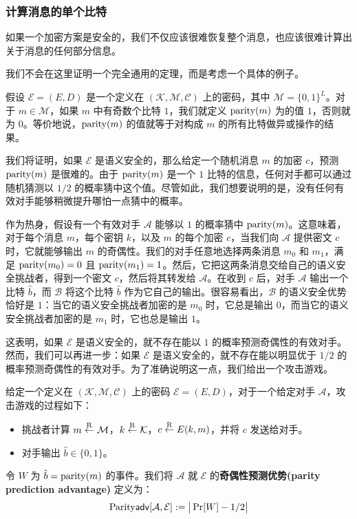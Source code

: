 \subsubsection{计算消息的单个比特}\label{subsubsec:2-2-3-2}

如果一个加密方案是安全的，我们不仅应该很难恢复整个消息，也应该很难计算出关于消息的任何部分信息。

我们不会在这里证明一个完全通用的定理，而是考虑一个具体的例子。

假设 $\mathcal{E}=(E,D)$ 是一个定义在 $(\mathcal{K},\mathcal{M},\mathcal{C})$ 上的密码，其中 $\mathcal{M}=\{0,1\}^L$。对于 $m\in\mathcal{M}$，如果 $m$ 中有奇数个比特 $1$，我们就定义 ${\rm parity}(m)$ 为的值 $1$，否则就为 $0$。等价地说，${\rm parity}(m)$ 的值就等于对构成 $m$ 的所有比特做异或操作的结果。

我们将证明，如果 $\mathcal{E}$ 是语义安全的，那么给定一个随机消息 $m$ 的加密 $c$，预测 ${\rm parity}(m)$ 是很难的。由于 ${\rm parity}(m)$ 是一个 $1$ 比特的信息，任何对手都可以通过随机猜测以 $1/2$ 的概率猜中这个值。尽管如此，我们想要说明的是，没有任何有效对手能够稍微提升哪怕一点猜中的概率。

作为热身，假设有一个有效对手 $\mathcal{A}$ 能够以 $1$ 的概率猜中 ${\rm parity}(m)$。这意味着，对于每个消息 $m$，每个密钥 $k$，以及 $m$ 的每个加密 $c$，当我们向 $\mathcal{A}$ 提供密文 $c$ 时，它就能够输出 $m$ 的奇偶性。我们的对手任意地选择两条消息 $m_0$ 和 $m_1$，满足 ${\rm parity}(m_0)=0$ 且 ${\rm parity}(m_1)=1$。然后，它把这两条消息交给自己的语义安全挑战者，得到一个密文 $c$，然后将其转发给 $\mathcal{A}$。在收到 $c$ 后，对手 $\mathcal{A}$ 输出一个比特 $\hat b$，而 $\mathcal{B}$ 将这个比特 $\hat b$ 作为它自己的输出。很容易看出，$\mathcal{B}$ 的语义安全优势恰好是 $1$：当它的语义安全挑战者加密的是 $m_0$ 时，它总是输出 $0$，而当它的语义安全挑战者加密的是 $m_1$ 时，它也总是输出 $1$。

这表明，如果 $\mathcal{E}$ 是语义安全的，就不存在能以 $1$ 的概率预测奇偶性的有效对手。然而，我们可以再进一步：如果 $\mathcal{E}$ 是语义安全的，就不存在能以明显优于 $1/2$ 的概率预测奇偶性的有效对手。为了准确说明这一点，我们给出一个攻击游戏。

\begin{game}[奇偶性预测]\label{game:2-3}
给定一个定义在 $(\mathcal{K},\mathcal{M},\mathcal{C})$ 上的密码 $\mathcal{E}=(E,D)$，对于一个给定对手 $\mathcal{A}$，攻击游戏的过程如下：
\begin{itemize}
	\item 挑战者计算 $m\overset{\rm R}\leftarrow\mathcal{M}$，$k\overset{\rm R}\leftarrow\mathcal{K}$，$c\overset{\rm R}\leftarrow E(k,m)$，并将 $c$ 发送给对手。
	\item 对手输出 $\hat b\in\{0,1\}$。
\end{itemize}

令 $W$ 为 $\hat b={\rm parity}(m)$ 的事件。我们将 $\mathcal{A}$ 就 $\mathcal{E}$ 的\textbf{奇偶性预测优势(parity prediction advantage)} 定义为：
\[
{\rm Parity\mathsf{adv}}[\mathcal{A},\mathcal{E}]
:=
\big\lvert
\Pr[W]-{1}/{2}
\big\rvert
\]
\end{game}


